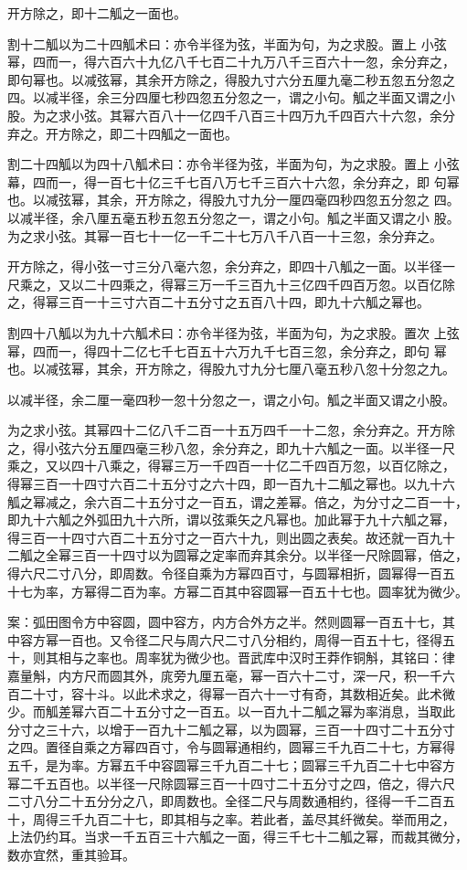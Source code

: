 \documentclass[a4paper,12pt,UTF8,twoside]{ctexbook}
\begin{document}
开方除之，即十二觚之一面也。

割十二觚以为二十四觚术曰：亦令半径为弦，半面为句，为之求股。置上 小弦幂，四而一，得六百六十九亿八千七百二十九万八千三百六十一忽，余分弃之， 即句幂也。以减弦幂，其余开方除之，得股九寸六分五厘九毫二秒五忽五分忽之 四。以减半径，余三分四厘七秒四忽五分忽之一，谓之小句。觚之半面又谓之小 股。为之求小弦。其幂六百八十一亿四千八百三十四万九千四百六十六忽，余分 弃之。开方除之，即二十四觚之一面也。

割二十四觚以为四十八觚术曰：亦令半径为弦，半面为句，为之求股。置上 小弦幕，四而一，得一百七十亿三千七百八万七千三百六十六忽，余分弃之，即 句幂也。以减弦幂，其余，开方除之，得股九寸九分一厘四毫四秒四忽五分忽之 四。以减半径，余八厘五毫五秒五忽五分忽之一，谓之小句。觚之半面又谓之小 股。为之求小弦。其幂一百七十一亿一千二十七万八千八百一十三忽，余分弃之。

开方除之，得小弦一寸三分八毫六忽，余分弃之，即四十八觚之一面。以半径一 尺乘之，又以二十四乘之，得幂三万一千三百九十三亿四千四百万忽。以百亿除 之，得幂三百一十三寸六百二十五分寸之五百八十四，即九十六觚之幂也。

割四十八觚以为九十六觚术曰：亦令半径为弦，半面为句，为之求股。置次 上弦幂，四而一，得四十二亿七千七百五十六万九千七百三忽，余分弃之，即句 幂也。以减弦幂，其余，开方除之，得股九寸九分七厘八毫五秒八忽十分忽之九。

以减半径，余二厘一毫四秒一忽十分忽之一，谓之小句。觚之半面又谓之小股。

为之求小弦。其幂四十二亿八千二百一十五万四千一十二忽，余分弃之。开方除 之，得小弦六分五厘四毫三秒八忽，余分弃之，即九十六觚之一面。以半径一尺 乘之，又以四十八乘之，得幂三万一千四百一十亿二千四百万忽，以百亿除之， 得幂三百一十四寸六百二十五分寸之六十四，即一百九十二觚之幂也。以九十六 觚之幂减之，余六百二十五分寸之一百五，谓之差幂。倍之，为分寸之二百一十， 即九十六觚之外弧田九十六所，谓以弦乘矢之凡幂也。加此幂于九十六觚之幂， 得三百一十四寸六百二十五分寸之一百六十九，则出圆之表矣。故还就一百九十 二觚之全幂三百一十四寸以为圆幂之定率而弃其余分。以半径一尺除圆幂，倍之， 得六尺二寸八分，即周数。令径自乘为方幂四百寸，与圆幂相折，圆幂得一百五 十七为率，方幂得二百为率。方幂二百其中容圆幂一百五十七也。圆率犹为微少。

案：弧田图令方中容圆，圆中容方，内方合外方之半。然则圆幂一百五十七，其 中容方幂一百也。又令径二尺与周六尺二寸八分相约，周得一百五十七，径得五 十，则其相与之率也。周率犹为微少也。晋武库中汉时王莽作铜斛，其铭曰：律 嘉量斛，内方尺而圆其外，庣旁九厘五毫，幂一百六十二寸，深一尺，积一千六 百二十寸，容十斗。以此术求之，得幂一百六十一寸有奇，其数相近矣。此术微 少。而觚差幂六百二十五分寸之一百五。以一百九十二觚之幂为率消息，当取此 分寸之三十六，以增于一百九十二觚之幂，以为圆幂，三百一十四寸二十五分寸 之四。置径自乘之方幂四百寸，令与圆幂通相约，圆幂三千九百二十七，方幂得 五千，是为率。方幂五千中容圆幂三千九百二十七；圆幂三千九百二十七中容方 幂二千五百也。以半径一尺除圆幂三百一十四寸二十五分寸之四，倍之，得六尺 二寸八分二十五分分之八，即周数也。全径二尺与周数通相约，径得一千二百五 十，周得三千九百二十七，即其相与之率。若此者，盖尽其纤微矣。举而用之， 上法仍约耳。当求一千五百三十六觚之一面，得三千七十二觚之幂，而裁其微分， 数亦宜然，重其验耳。
\end{document}
